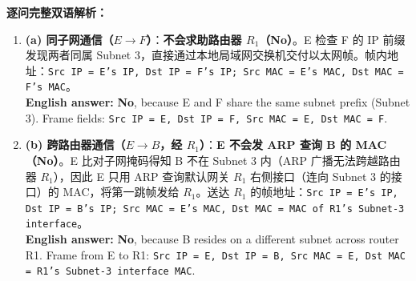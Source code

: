 \textbf{逐问完整双语解析：}
\begin{enumerate}
\item \textbf{(a) 同子网通信（$E \to F$）}：\textbf{不会求助路由器 $R_1$（No）}。E 检查 F 的 IP 前缀发现两者同属 Subnet 3，直接通过本地局域网交换机交付以太网帧。帧内地址：\texttt{Src IP = E's IP, Dst IP = F's IP; Src MAC = E's MAC, Dst MAC = F's MAC}。 \\
\textbf{English answer:} \textbf{No}, because E and F share the same subnet prefix (Subnet 3). Frame fields: \texttt{Src IP = E, Dst IP = F, Src MAC = E, Dst MAC = F}.

\item \textbf{(b) 跨路由器通信（$E \to B$，经 $R_1$）}：\textbf{E 不会发 ARP 查询 B 的 MAC（No）}。E 比对子网掩码得知 B 不在 Subnet 3 内（ARP 广播无法跨越路由器 $R_1$），因此 E 只用 ARP 查询默认网关 $R_1$ 右侧接口（连向 Subnet 3 的接口）的 MAC，将第一跳帧发给 $R_1$。送达 $R_1$ 的帧地址：\texttt{Src IP = E's IP, Dst IP = B's IP; Src MAC = E's MAC, Dst MAC = MAC of R1's Subnet-3 interface}。 \\
\textbf{English answer:} \textbf{No}, because B resides on a different subnet across router R1. Frame from E to R1: \texttt{Src IP = E, Dst IP = B, Src MAC = E, Dst MAC = R1's Subnet-3 interface MAC}.


\end{enumerate}
